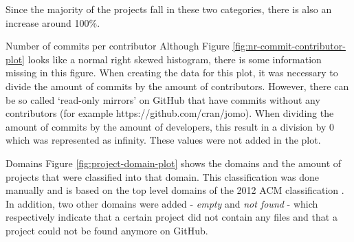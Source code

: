 \begin{LaTeXdescription}
    	Since the majority of the projects fall in these two categories, there is also an increase around 100\%.
    	\item[Number of commits per contributor]
    	Although Figure \ref{fig:nr-commit-contributor-plot} looks like a normal right skewed histogram, there is some information missing in this figure.
    	When creating the data for this plot, it was necessary to divide the amount of commits by the amount of contributors.
    	However, there can be so called `read-only mirrors' on GitHub that have commits without any contributors (for example https://github.com/cran/jomo).
    	When dividing the amount of commits by the amount of developers, this result in a division by 0 which was represented as infinity.
    	These values were not added in the plot. 
    	\item[Domains]
    	Figure \ref{fig:project-domain-plot} shows the domains and the amount of projects that were classified into that domain.
    	This classification was done manually and is based on the top level domains of the 2012 ACM classification \cite{acm-2012}.
    	In addition, two other domains were added - \textit{empty} and \textit{not found} - which respectively indicate that a certain project did not contain any files and that a project could not be found anymore on GitHub.
    	\end{LaTeXdescription}
        




